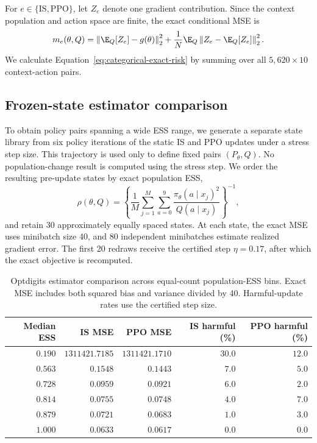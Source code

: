For $e\in\{\mathrm{IS},\mathrm{PPO}\}$, let $Z_e$ denote one gradient contribution. Since the context population and action space are finite, the exact conditional MSE is
\begin{equation}
 m_e(\theta,Q)
 =\left\|\E_Q[Z_e]-g(\theta)\right\|_2^2
 +\frac1N\E_Q\left\|Z_e-\E_Q[Z_e]\right\|_2^2.
 \label{eq:categorical-exact-risk}
\end{equation}
We calculate Equation~\eqref{eq:categorical-exact-risk} by summing over all $5{,}620\times10$ context-action pairs.

\subsection{Frozen-state estimator comparison}

To obtain policy pairs spanning a wide ESS range, we generate a separate state library from six policy iterations of the static IS and PPO updates under a stress step size. This trajectory is used only to define fixed pairs $(P_\theta,Q)$. No population-change result is computed using the stress step. We order the resulting pre-update states by exact population ESS,
\begin{equation}
 \rho(\theta,Q)
 =\left\{
 \frac1M\sum_{j=1}^M\sum_{a=0}^9
 \frac{\pi_\theta(a\mid x_j)^2}{Q(a\mid x_j)}
 \right\}^{-1},
 \label{eq:categorical-population-ess}
\end{equation}
and retain 30 approximately equally spaced states. At each state, the exact MSE uses minibatch size 40, and 80 independent minibatches estimate realized gradient error. The first 20 redraws receive the certified step $\eta=0.17$, after which the exact objective is recomputed.

\begin{table}[htbp]
\centering
\small
\caption{Optdigits estimator comparison across equal-count population-ESS bins. Exact MSE includes both squared bias and variance divided by 40. Harmful-update rates use the certified step size.}
\label{tab:categorical-ess-bins}
\begin{tabular}{rrrrr}
\toprule
Median ESS & IS MSE & PPO MSE & IS harmful (\%) & PPO harmful (\%) \\
\midrule
$0.190$ & $1311421.7185$ & $1311421.1710$ & $30.0$ & $12.0$ \\
$0.563$ & $0.1548$ & $0.1443$ & $7.0$ & $5.0$ \\
$0.728$ & $0.0959$ & $0.0921$ & $6.0$ & $2.0$ \\
$0.814$ & $0.0755$ & $0.0748$ & $4.0$ & $7.0$ \\
$0.879$ & $0.0721$ & $0.0683$ & $1.0$ & $3.0$ \\
$1.000$ & $0.0633$ & $0.0617$ & $0.0$ & $0.0$ \\
\bottomrule
\end{tabular}
\end{table}

